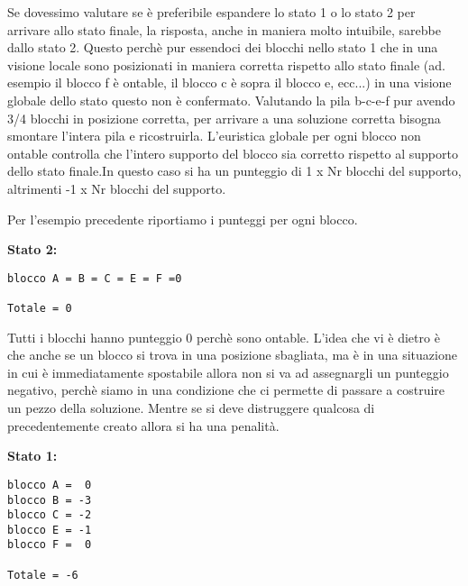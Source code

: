 Se dovessimo valutare se è preferibile espandere lo stato 1 o lo stato 2 per arrivare allo stato finale, la risposta, anche in maniera molto intuibile, sarebbe dallo stato 2. Questo perchè pur essendoci dei blocchi nello stato 1 che in una visione locale sono posizionati in maniera corretta rispetto allo stato finale (ad. esempio il blocco f è ontable, il blocco c è sopra il blocco e, ecc...) in una visione globale dello stato questo non è confermato. Valutando la pila  b-c-e-f pur avendo 3/4 blocchi in posizione corretta, per arrivare a una soluzione corretta bisogna smontare l'intera pila e ricostruirla.
L'euristica globale per ogni blocco non ontable controlla che l'intero supporto del blocco sia corretto rispetto al supporto dello stato finale.In questo caso si ha un punteggio di 1 x Nr blocchi del supporto, altrimenti -1 x Nr blocchi del supporto. 

Per l'esempio precedente riportiamo i punteggi per ogni blocco.

\textbf{Stato 2:}
\begin{lstlisting}
blocco A = B = C = E = F =0

Totale = 0
\end{lstlisting}
Tutti i blocchi hanno punteggio 0 perchè sono ontable. L'idea che vi è dietro è che anche se un blocco si trova in una posizione
sbagliata, ma è in una situazione in cui è immediatamente spostabile allora non si va ad assegnargli un punteggio negativo, perchè
siamo in una condizione che ci permette di passare a costruire un pezzo della soluzione. Mentre se si deve distruggere qualcosa di
precedentemente creato allora si ha una penalità.

\textbf{Stato 1:}
\begin{lstlisting}
blocco A =  0
blocco B = -3
blocco C = -2
blocco E = -1
blocco F =  0

Totale = -6
\end{lstlisting}

